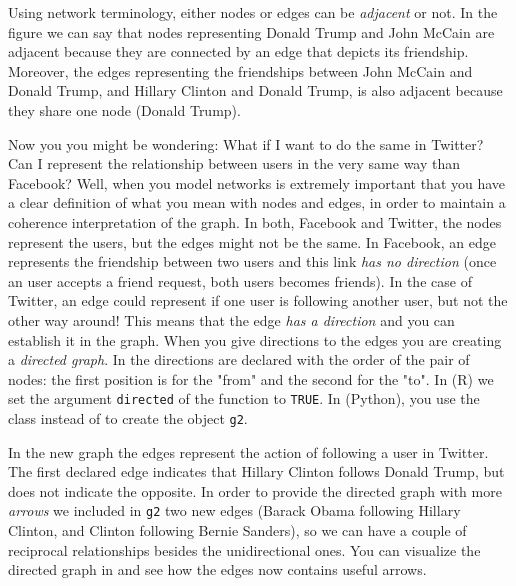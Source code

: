 
Using network terminology, either nodes or edges can be \textit{adjacent} or not. In the figure we can say that nodes representing Donald Trump and John McCain are adjacent because they are connected by an edge that depicts its friendship. Moreover, the edges representing the friendships between John McCain and Donald Trump, and Hillary Clinton and Donald Trump, is also adjacent because they share one node (Donald Trump).

Now you you might be wondering: What if I want to do the same in Twitter? Can I represent the relationship between users in the very same way than Facebook? Well, when you model networks is extremely important that you have a clear definition of what you mean with nodes and edges, in order to maintain a coherence interpretation of the graph. In both, Facebook and Twitter, the nodes represent the users, but the edges might not be the same. In Facebook, an edge represents the friendship between two users and this link \textit{has no direction} (once an user accepts a friend request, both users becomes friends). In the case of Twitter, an edge could represent if one user is following another user, but not the other way around! This means that the edge \textit{has a direction} and you can establish it in the graph. When you give directions to the edges you are creating a \textit{directed graph}. In  the directions are declared with the order of the pair of nodes: the first position is for the "from" and the second for the "to". In  (R) we  set the argument \verb+directed+ of the function  to \verb+TRUE+. In  (Python), you use the class  instead of  to create the object \texttt{g2}.


In the new graph the edges represent the action of following a user in Twitter. The first declared edge indicates that Hillary Clinton follows Donald Trump, but does not indicate the opposite. In order to provide the directed graph with more \textit{arrows} we included in \texttt{g2} two new edges (Barack Obama following Hillary Clinton, and Clinton following Bernie Sanders), so we can have a couple of reciprocal relationships besides the unidirectional ones. You can visualize the directed graph in  and see how the edges now contains useful arrows.

